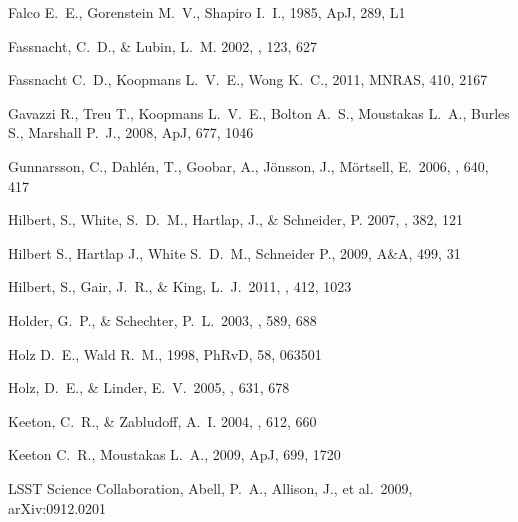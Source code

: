\begin{thebibliography}{99}
 Falco E.~E., Gorenstein M.~V., Shapiro I.~I., 1985, ApJ, 289, L1 


{Fassnacht}, C.~D., \& {Lubin}, L.~M. 2002, \aj, 123, 627

 Fassnacht C.~D., Koopmans L.~V.~E., Wong K.~C., 2011, MNRAS, 410, 2167 


 Gavazzi R., Treu T., Koopmans L.~V.~E., 
Bolton A.~S., Moustakas L.~A., Burles S., Marshall P.~J., 2008, ApJ, 677, 
1046 

 Gunnarsson, C., 
Dahl{\'e}n, T., Goobar, A., J{\"o}nsson, J., M{\"o}rtsell, E.\ 2006, \apj, 640, 417 

{Hilbert}, S., {White}, S.~D.~M., {Hartlap}, J., \& {Schneider}, P. 2007,
  \mnras, 382, 121

 Hilbert S., Hartlap J., White S.~D.~M., Schneider P., 2009, A\&A, 499, 31 

 Hilbert, S., Gair, 
J.~R., \& King, L.~J.\ 2011, \mnras, 412, 1023 

 Holder, G.~P., \& Schechter, P.~L.\ 2003, \apj, 589, 688 


 Holz D.~E., Wald R.~M., 1998, PhRvD, 58, 063501 

 Holz, D.~E., \& Linder, E.~V.\ 2005, \apj, 631, 678 

{Keeton}, C.~R., \& {Zabludoff}, A.~I. 2004, \apj, 612, 660

 Keeton C.~R., Moustakas L.~A., 2009, ApJ, 699, 1720 


 LSST 
Science Collaboration, Abell, P.~A., Allison, J., et al.\ 2009, 
arXiv:0912.0201 


\end{thebibliography}
